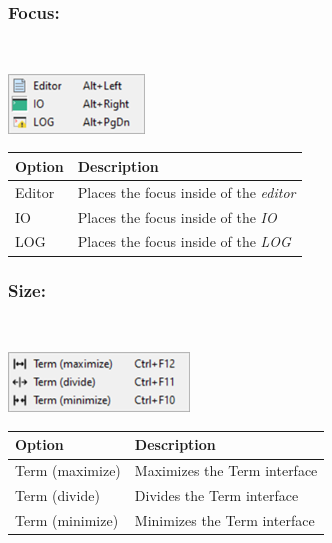 \hypertarget{menu_r_term_focus}{}
\subsubsection{Focus:}\\

\includegraphics[scale=0.50]{./res/menu_r_term_focus.png}\\

\begin{scriptsize}
  \begin{tabularx}{\textwidth}{>{\hsize=0.3\hsize}X>{\hsize=0.7\hsize}X}\\
    \hline
    \textbf{Option} & \textbf{Description} \\
    \hline
    Editor & Places the focus inside of the \textit{editor} \\
    IO & Places the focus inside of the \textit{IO} \\
    LOG & Places the focus inside of the \textit{LOG} \\
    \hline
  \end{tabularx}
\end{scriptsize}

\hypertarget{menu_r_term_size}{}
\subsubsection{Size:}\\

\includegraphics[scale=0.50]{./res/menu_r_term_size.png}\\

\begin{scriptsize}
  \begin{tabularx}{\textwidth}{>{\hsize=0.3\hsize}X>{\hsize=0.7\hsize}X}\\
    \hline
    \textbf{Option} & \textbf{Description} \\
    \hline
    Term (maximize) & Maximizes the Term interface \\
    Term (divide) & Divides the Term interface \\
    Term (minimize) & Minimizes the Term interface \\
    \hline
  \end{tabularx}
\end{scriptsize}

